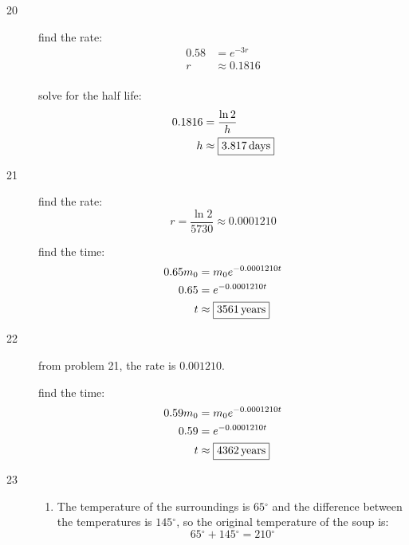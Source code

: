 \documentclass{exam}
\newcommand{\degree}{\ensuremath{^\circ}}
\begin{document}
\begin{description}
\begin{enumerate}[a]
        \end{enumerate}

      \item[20]
        find the rate:
        \begin{align*}
          0.58 & = e^{-3r} \\
          r    & \approx 0.1816 \\
        \end{align*}

        solve for the half life:
        \begin{align*}
          0.1816 & = \frac{\ln 2}{h} \\
          h      & \approx \boxed{\unit[3.817]{days}} \\
        \end{align*}

      \item[21]
        find the rate: 
        \[
          r = \frac{\ln 2}{5730} \approx 0.0001210
        \]

        find the time:
        \begin{align*}
          0.65 m_0 & = m_0 e^{-0.0001210 t} \\
          0.65     & =  e^{-0.0001210 t} \\
          t        & \approx \boxed{\unit[3561]{years}} \\
        \end{align*}

      \item[22]
        from problem 21, the rate is $0.001210$.

        find the time:
        \begin{align*}
          0.59 m_0 & = m_0 e^{-0.0001210 t} \\
          0.59     & =  e^{-0.0001210 t} \\
          t        & \approx \boxed{\unit[4362]{years}} \\
        \end{align*}

      \item[23]
        \begin{enumerate}[a]
          \item The temperature of the surroundings is $65 \degree$ and the difference between the temperatures is
            $145 \degree$, so the original temperature of the soup is:
            \[
              65 \degree + 145 \degree = \boxed{210 \degree}
            \]


\end{enumerate}
\end{description}
\end{document}
